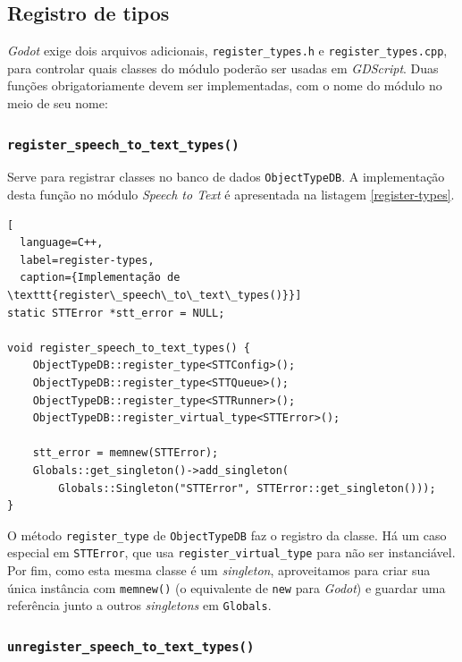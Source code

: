 
\subsection{Registro de tipos}

\textit{Godot} exige dois arquivos adicionais, \texttt{register\_types.h} e \texttt{register\_types.cpp}, para controlar quais classes do módulo poderão ser usadas em \textit{GDScript}. Duas funções obrigatoriamente devem ser implementadas, com o nome do módulo no meio de seu nome:

\subsubsection{\texttt{register\_speech\_to\_text\_types()}}

Serve para registrar classes no banco de dados \texttt{ObjectTypeDB}. A implementação desta função no módulo \textit{Speech to Text} é apresentada na listagem \ref{register-types}.

\begin{lstlisting}[
  language=C++,
  label=register-types,
  caption={Implementação de \texttt{register\_speech\_to\_text\_types()}}]
static STTError *stt_error = NULL;

void register_speech_to_text_types() {
    ObjectTypeDB::register_type<STTConfig>();
    ObjectTypeDB::register_type<STTQueue>();
    ObjectTypeDB::register_type<STTRunner>();
    ObjectTypeDB::register_virtual_type<STTError>();

    stt_error = memnew(STTError);
    Globals::get_singleton()->add_singleton(
        Globals::Singleton("STTError", STTError::get_singleton()));
}
\end{lstlisting}

O método \texttt{register\_type} de \texttt{ObjectTypeDB} faz o registro da classe. Há um caso especial em \texttt{STTError}, que usa \texttt{register\_virtual\_type} para não ser instanciável. Por fim, como esta mesma classe é um \textit{singleton}, aproveitamos para criar sua única instância com \texttt{memnew()} (o equivalente de \texttt{new} para \textit{Godot}) e guardar uma referência junto a outros \textit{singletons} em \texttt{Globals}.

\subsubsection{\texttt{unregister\_speech\_to\_text\_types()}}

